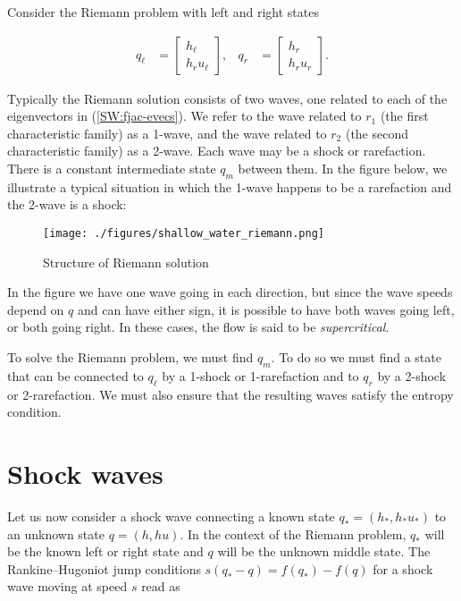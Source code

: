 \documentclass{SIAMbook2016}
\makeatletter
\def\maxwidth{\ifdim\Gin@nat@width>\linewidth\linewidth
    \else\Gin@nat@width\fi}
\let\Oldincludegraphics\includegraphics
\renewcommand{\includegraphics}[1]{\Oldincludegraphics[width=.8\maxwidth]{#1}}
\makeatother
\begin{document}
Consider the Riemann problem with left and right states

\begin{align*}
q_\ell & = \begin{bmatrix} h_\ell \\ h_r u_\ell \end{bmatrix}, &
q_r & = \begin{bmatrix} h_r \\ h_r u_r \end{bmatrix}. 
\end{align*}

Typically the Riemann solution consists of two waves, one related to
each of the eigenvectors in (\ref{SW:fjac-evecs}). We refer to the wave
related to \(r_1\) (the first characteristic family) as a 1-wave, and
the wave related to \(r_2\) (the second characteristic family) as a
2-wave. Each wave may be a shock or rarefaction. There is a constant
intermediate state \(q_m\) between them. In the figure below, we
illustrate a typical situation in which the 1-wave happens to be a
rarefaction and the 2-wave is a shock:

\begin{figure}
\centering
\texttt{[image: ./figures/shallow\_water\_riemann.png]}
\caption{Structure of Riemann solution}
\end{figure}

In the figure we have one wave going in each direction, but since the
wave speeds depend on \(q\) and can have either sign, it is possible to
have both waves going left, or both going right. In these cases, the
flow is said to be \emph{supercritical}.

To solve the Riemann problem, we must find \(q_m\). To do so we must
find a state that can be connected to \(q_\ell\) by a 1-shock or
1-rarefaction and to \(q_r\) by a 2-shock or 2-rarefaction. We must also
ensure that the resulting waves satisfy the entropy condition.

\hypertarget{shock-waves}{%
\section{Shock waves}\label{shock-waves}}

Let us now consider a shock wave connecting a known state
\(q_*=(h_*, h_* u_*)\) to an unknown state \(q=(h,hu)\). In the context
of the Riemann problem, \(q_*\) will be the known left or right state
and \(q\) will be the unknown middle state. The Rankine--Hugoniot jump
conditions \(s(q_* - q) = f(q_*) - f(q)\) for a shock wave moving at
speed \(s\) read as
\end{document}
